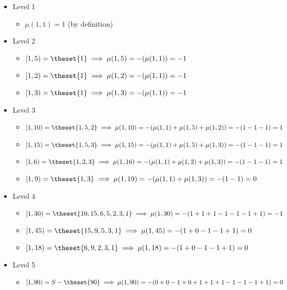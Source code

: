 \begin{solution}

\hfill

\begin{itemize}
\tightlist
\item
  Level 1

  \begin{itemize}
  \tightlist
  \item
    \(\mu(1,1) = 1\) (by definition)
  \end{itemize}
\item
  Level 2

  \begin{itemize}
  \tightlist
  \item
    \([1, 5) = \theset{1} \implies \mu(1,5) = -(\mu(1,1)) = -1\)
  \item
    \([1, 2) = \theset{1} \implies \mu(1,2) = -(\mu(1,1)) = -1\)
  \item
    \([1, 3) = \theset{1} \implies \mu(1,3) = -(\mu(1,1)) = -1\)
  \end{itemize}
\item
  Level 3

  \begin{itemize}
  \tightlist
  \item
    \([1, 10) = \theset{1,5,2} \implies \mu(1,10) = -(\mu(1,1)+\mu(1,5)+\mu(1,2))= -(1-1-1) = 1\)
  \item
    \([1, 15) = \theset{1,5,3} \implies \mu(1,15) = -(\mu(1,1)+\mu(1,5)+\mu(1,3))= -(1-1-1) = 1\)
  \item
    \([1, 6) = \theset{1,2,3} \implies \mu(1,16) = -(\mu(1,1)+\mu(1,2)+\mu(1,3))= -(1-1-1) = 1\)
  \item
    \([1, 9) = \theset{1,3} \implies \mu(1,19) = -(\mu(1,1)+\mu(1,3)) = -(1-1) = 0\)
  \end{itemize}
\item
  Level 4

  \begin{itemize}
  \tightlist
  \item
    \([1,30) = \theset{10,15,6,5,2,3,1} \implies \mu(1,30) = -(1+1+1-1-1-1+1) = -1\)
  \item
    \([1,45) = \theset{15,9,5,3,1} \implies \mu(1,45) = -(1+0-1-1+1) = 0\)
  \item
    \([1,18) = \theset{6,9,2,3,1} \implies \mu(1,18) = -(1+0-1-1+1) = 0\)
  \end{itemize}
\item
  Level 5

  \begin{itemize}
  \tightlist
  \item
    \([1, 90) = S - \theset{90} \implies \mu(1,90) = -(0+0-1+0+1+1+1-1-1-1+1) = 0\)
  \end{itemize}
\end{itemize}

\end{solution}

